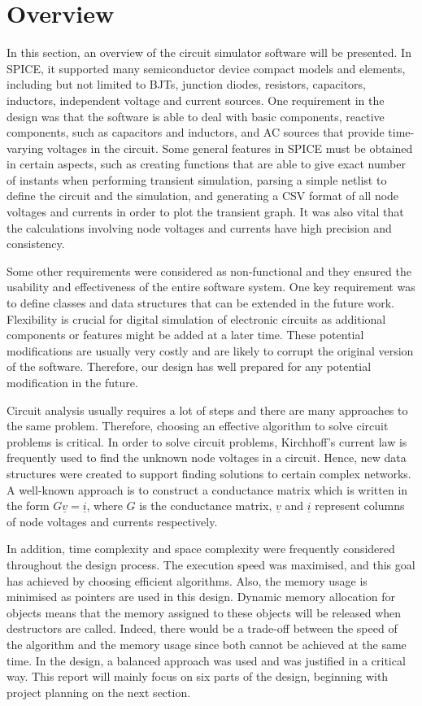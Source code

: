\section{Overview}

In this section, an overview of the circuit simulator software will be presented. In SPICE, it supported many semiconductor device compact models and elements, including but not limited to BJTs, junction diodes, resistors, capacitors, inductors, independent voltage and current sources.\cite{SPICE} One requirement in the design was that the software is able to deal with basic components, reactive components, such as capacitors and inductors, and AC sources that provide time-varying voltages in the circuit. Some general features in SPICE must be obtained in certain aspects, such as creating functions that are able to give exact number of instants when performing transient simulation, parsing a simple netlist to define the circuit and the simulation, and generating a CSV format of all node voltages and currents in order to plot the transient graph. It was also vital that the calculations involving node voltages and currents have high precision and consistency.

Some other requirements were considered as non-functional and they ensured the usability and effectiveness of the entire software system. One key requirement was to define classes and data structures that can be extended in the future work. Flexibility is crucial for digital simulation of electronic circuits as additional components or features might be added at a later time. These potential modifications are usually very costly and are likely to corrupt the original version of the software. Therefore, our design has well prepared for any potential modification in the future.

Circuit analysis usually requires a lot of steps and there are many approaches to the same problem. Therefore, choosing an effective algorithm to solve circuit problems is critical. In order to solve circuit problems, Kirchhoff’s current law is frequently used to find the unknown node voltages in a circuit. Hence, new data structures were created to support finding solutions to certain complex networks. A well-known approach is to construct a conductance matrix which is written in the form $G\underline{v} = \underline{i}$, where $G$ is the conductance matrix, $\underline{v}$ and $\underline{i}$ represent columns of node voltages and currents respectively.

In addition, time complexity and space complexity were frequently considered throughout the design process. The execution speed was maximised, and this goal has achieved by choosing efficient algorithms. Also, the memory usage is minimised as pointers are used in this design. Dynamic memory allocation for objects means that the memory assigned to these objects will be released when destructors are called. Indeed, there would be a trade-off between the speed of the algorithm and the memory usage since both cannot be achieved at the same time. In the design, a balanced approach was used and was justified in a critical way. This report will mainly focus on six parts of the design, beginning with project planning on the next section.

